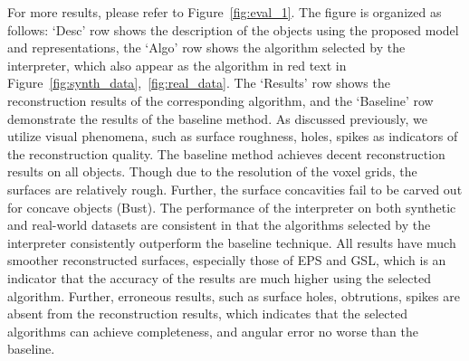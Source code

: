 For more results, please refer to Figure~\ref{fig:eval_1}. The figure is organized as follows: `Desc' row shows the description of the objects using the proposed model and representations, the `Algo' row shows the algorithm selected by the interpreter, which also appear as the algorithm in red text in Figure~\ref{fig:synth_data},~\ref{fig:real_data}. The `Results' row shows the reconstruction results of the corresponding algorithm, and the `Baseline' row demonstrate the results of the baseline method. As discussed previously, we utilize visual phenomena, such as surface roughness, holes, spikes as indicators of the reconstruction quality. The baseline method achieves decent reconstruction results on all objects. Though due to the resolution of the voxel grids, the surfaces are relatively rough. Further, the surface concavities fail to be carved out for concave objects (Bust). The performance of the interpreter on both synthetic and real-world datasets are consistent in that the algorithms selected by the interpreter consistently outperform the baseline technique. All results have much smoother reconstructed surfaces, especially those of EPS and GSL, which is an indicator that the accuracy of the results are much higher using the selected algorithm. Further, erroneous results, such as surface holes, obtrutions, spikes are absent from the reconstruction results, which indicates that the selected algorithms can achieve completeness, and angular error no worse than the baseline.

